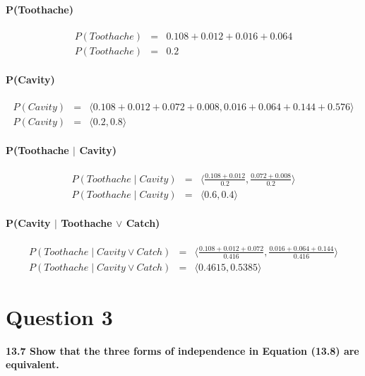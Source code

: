 \documentclass[a4paper, 12 pt, conference, onecolumn]{IEEEconf}
\begin{document}
\paragraph{\textbf{P}(Toothache)} 
\begin{eqnarray}
P(Toothache) &=& 0.108 + 0.012 + 0.016 + 0.064\\
P(Toothache) &=& 0.2
\end{eqnarray}

\paragraph{\textbf{P}(Cavity)}
\begin{eqnarray}
P(Cavity) &=& \langle 0.108 + 0.012 + 0.072 + 0.008, 0.016 + 0.064 + 0.144 + 0.576 \rangle \\
P(Cavity) &=& \langle 0.2, 0.8 \rangle
\end{eqnarray}

\paragraph{\textbf{P}(Toothache $\mid$ Cavity)}

\begin{eqnarray}
P(Toothache \mid Cavity) &=& \langle \frac{0.108+0.012}{0.2}, \frac{0.072+0.008}{0.2} \rangle \\
P(Toothache \mid Cavity) &=& \langle 0.6, 0.4 \rangle
\end{eqnarray}

\paragraph{\textbf{P}(Cavity $\mid$ Toothache $\vee$ Catch)}
\begin{eqnarray}
P(Toothache \mid Cavity \vee Catch) &=& \langle \frac{0.108+0.012+0.072}{0.416}, \frac{0.016+0.064+0.144}{0.416} \rangle \\
P(Toothache \mid Cavity \vee Catch) &=& \langle 0.4615, 0.5385 \rangle
\end{eqnarray}

\section{Question 3}
\setcounter{paragraph}{0}
\textbf{13.7 Show that the three forms of independence in Equation (13.8) are equivalent.}
\end{document}
